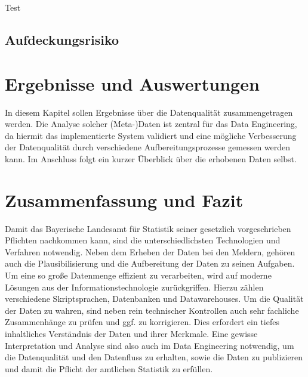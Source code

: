Test

\subsection{Aufdeckungsrisiko}



\section{Ergebnisse und Auswertungen}

In diesem Kapitel sollen Ergebnisse über die Datenqualität zusammengetragen werden. Die Analyse solcher (Meta-)Daten ist zentral für das Data Engineering, da hiermit das implementierte System validiert und eine mögliche Verbesserung der Datenqualität durch verschiedene Aufbereitungsprozesse gemessen werden kann. Im Anschluss folgt ein kurzer Überblick über die erhobenen Daten selbst.



\section{Zusammenfassung und Fazit}

Damit das Bayerische Landesamt für Statistik seiner gesetzlich vorgeschrieben Pflichten nachkommen kann, sind die unterschiedlichsten Technologien und Verfahren notwendig. Neben dem Erheben der Daten bei den Meldern, gehören auch die Plausibilisierung und die Aufbereitung der Daten zu seinen Aufgaben. Um eine so große Datenmenge effizient zu verarbeiten, wird auf moderne Lösungen aus der Informationstechnologie zurückgriffen. Hierzu zählen verschiedene Skriptsprachen, Datenbanken und Datawarehouses. Um die Qualität der Daten zu wahren, sind neben rein technischer Kontrollen auch sehr fachliche Zusammenhänge zu prüfen und ggf. zu korrigieren. Dies erfordert ein tiefes inhaltliches Verständnis der Daten und ihrer Merkmale. Eine gewisse Interpretation und Analyse sind also auch im Data Engineering notwendig, um die Datenqualität und den Datenfluss zu erhalten, sowie die Daten zu publizieren und damit die Pflicht der amtlichen Statistik zu erfüllen. 

\newpage%

